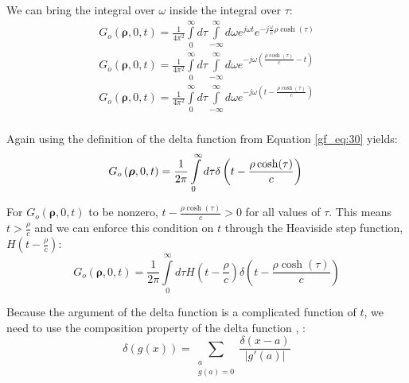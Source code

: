 \noindent We can bring the integral over $\omega$ inside the integral over $\tau$:
\begin{equation}
\begin{gathered}
G_o\left(\boldsymbol{\rho},0,t\right) = \frac{1}{4\pi^2}\int\limits_{0}^{\infty}d\tau\int\limits_{-\infty}^{\infty}d\omega e^{j\omega t} e^{-j\frac{\omega}{c}\rho\cosh(\tau)}\\
G_o\left(\boldsymbol{\rho},0,t\right) = \frac{1}{4\pi^2}\int\limits_{0}^{\infty}d\tau\int\limits_{-\infty}^{\infty}d\omega e^{-j\omega \left(\frac{\rho \cosh(\tau)}{c} - t\right)}\\
G_o\left(\boldsymbol{\rho},0,t\right) = \frac{1}{4\pi^2}\int\limits_{0}^{\infty}d\tau\int\limits_{-\infty}^{\infty}d\omega e^{-j\omega \left(t - \frac{\rho \cosh(\tau)}{c}\right)}\\
\end{gathered}
\label{gf_eq:40e}
\end{equation}
\renewcommand{\baselinestretch}{2} \small\normalsize

\noindent Again using the definition of the delta function from Equation \ref{gf_eq:30} yields:
\begin{equation}
G_o\left(\boldsymbol{\rho},0,t\right) = \frac{1}{2\pi}\int\limits_{0}^{\infty}d\tau \delta\left(t - \frac{\rho \cosh(\tau)}{c}\right)\\
\label{gf_eq:40f}
\end{equation}
\renewcommand{\baselinestretch}{2} \small\normalsize

For $G_o\left(\boldsymbol{\rho},0,t\right)$ to be nonzero, $t - \frac{\rho \cosh(\tau)}{c} > 0$ for all values of $\tau$. This means $t > \frac{\rho}{c}$ and we can enforce this condition on $t$ through the Heaviside step function, $H\left(t -\frac{\rho}{c}\right)$:
 \begin{equation}
G_o\left(\boldsymbol{\rho},0,t\right) = \frac{1}{2\pi}\int\limits_{0}^{\infty}d\tau H\left(t -\frac{\rho}{c}\right) \delta\left(t - \frac{\rho \cosh(\tau)}{c}\right)
\label{gf_eq:40g}
\end{equation}
 \renewcommand{\baselinestretch}{2} \small\normalsize
 
Because the argument of the delta function is a complicated function of $t$, we need to use the composition property of the delta function \cite{arfken_weber}, \cite{gbur_math}:
 \begin{equation}
\delta\left(g(x) \right) = \sum_{\substack{a \\g(a)=0}}\frac{\delta(x-a)}{|g'(a)|}
\label{gf_eq:40h}
\end{equation}
 \renewcommand{\baselinestretch}{2} \small\normalsize
 
